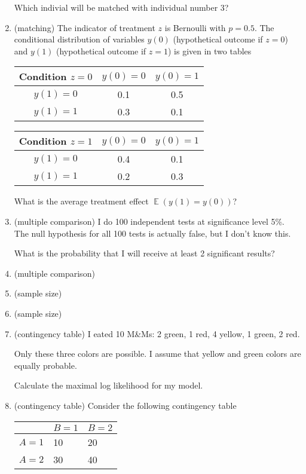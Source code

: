 \documentclass[12pt]{article}
\DeclareMathOperator{\E}{\mathbb{E}}
\begin{document}
\begin{enumerate}
    Which indivial will be matched with individual number 3?
    

    \item (matching) The indicator of treatment $z$ is Bernoulli with $p=0.5$. 
    The conditional distribution of variables $y(0)$ (hypothetical outcome if $z =0$) and $y(1)$ (hypothetical outcome if $z=1$) 
    is given in two tables

    \begin{tabular}{ccc}
    \toprule
    Condition $z = 0$ & $y(0) = 0$ & $y(0) = 1$ \\
    \midrule
    $y(1)=0$ & 0.1 & 0.5 \\
    $y(1)=1$ & 0.3 & 0.1 \\
    \bottomrule
    \end{tabular}

    \begin{tabular}{ccc}
        \toprule
        Condition $z = 1$ & $y(0) = 0$ & $y(0) = 1$ \\
        \midrule
        $y(1)=0$ & 0.4 & 0.1 \\
        $y(1)=1$ & 0.2 & 0.3 \\
        \bottomrule
    \end{tabular}

    What is the average treatment effect $\E(y(1) = y(0))$?


    \item (multiple comparison) I do 100 independent tests at significance level 5\%. 
    The null hypothesis for all 100 tests is actually false, but I don't know this. 
    
    What is the probability that I will receive at least 2 significant results?
    
    \item (multiple comparison)
    \item (sample size)
    \item (sample size)
    \item (contingency table) I eated 10 M\&Ms: 2 green, 1 red, 4 yellow, 1 green, 2 red.  
    
    Only these three colors are possible. I assume that yellow and green colors are equally probable.  
    
    Calculate the maximal log likelihood for my model.  
    \item (contingency table) Consider the following contingency table 
    
    \begin{tabular}{@{}lll@{}}
        \toprule
         & $B=1$ & $B=2$ \\ 
         \midrule
         $A=1$ & 10 & 20 \\
         $A=2$ & 30 & 40 \\
        \bottomrule
        \end{tabular}



\end{enumerate}
\end{document}
